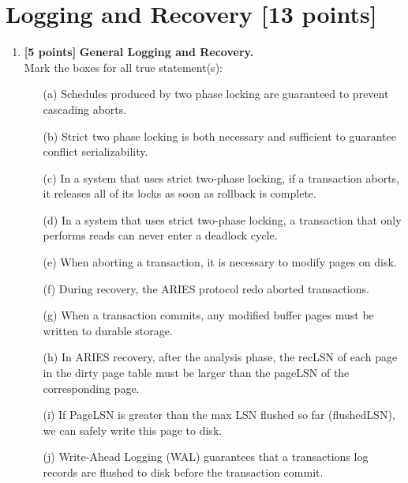 \documentclass[10pt]{article}
\begin{document}
\newpage
\section{Logging and Recovery \textbf{[13 points]}}
\begin{enumerate}
	\item \textbf{[5 points]} \textbf{General Logging and Recovery.} \\
	      Mark the boxes for all true statement(s):
	      \begin{itemize}
		      \item[(a)] Schedules produced by two phase locking are guaranteed to prevent cascading aborts.
		      \item[(b)] Strict two phase locking is both necessary and sufficient to guarantee conflict serializability.
		      \item[(c)] In a system that uses strict two-phase locking, if a transaction aborts, it releases all of its locks as soon as rollback is complete.
		      \item[(d)] In a system that uses strict two-phase locking, a transaction that only performs reads can never enter a deadlock cycle.
		      \item[(e)] When aborting a transaction, it is necessary to modify pages on disk.
		      \item[(f)] During recovery, the ARIES protocol redo aborted transactions.
		      \item[(g)] When a transaction commits, any modified buffer pages must be written to durable storage.
		      \item[(h)] In ARIES recovery, after the analysis phase, the recLSN of each page in the dirty page table must be larger than the pageLSN of the corresponding page.
		      \item[(i)] If PageLSN is greater than the max LSN flushed so far (flushedLSN), we can safely write this page to disk.
		      \item[(j)] Write-Ahead Logging (WAL) guarantees that a transactions log records are flushed to disk before the transaction commit.
	      \end{itemize}


\end{enumerate}
\end{document}

